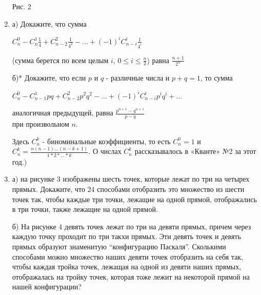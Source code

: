 \begin{enumerate}[font=\bfseries, wide,  labelindent=0pt, noitemsep]
Рис. 2
\newline
    \item а) Докажите, что сумма
    \begin{center}
    $C_{n}^{0} - C_{n}^{1} \frac{1}{4} + C_{n-2}^{2} \frac{1}{4^2} - ... + (-1)^i C_{n-i}^{i} \frac{1}{4^i}$
    \end{center}
    (сумма берется по всем целым $i$, $0 \leq i \leq \frac{n}{2}$) равна $\frac{n+1}{2^n}$ 
    \par
    б)* Докажите, что если $p$ и $q$ - различные числа и $p + q = 1$, то сумма 
    \begin{center}
    $C_{n}^{0}-C_{n-1}^{1}pq+C_{n-2}^{2}p^2q^2 - ... + (-1)^iC_{n-i}^{i}p^iq^i+...$
    \end{center}
    аналогичная предыдущей, равна $\frac{p^{n+1}-q^{n+1}}{p-q}$ \\
    при произвольном $n$. \par
    Здесь $C_{n}^{k}$ - биноминальные коэффициенты, то есть $C_{n}^{0} = 1$ и $C_{n}^{k} = \frac{n(n-1)...(n-k+1)}{1*2*...*k}$. О числах $C_{n}^{k}$ рассказывалось в «Кванте» №2 за этот год.) 
    \par
{}
\item
    а) на рисунке 3 изображены шесть точек, которые лежат по три на четырех прямых. Докажите, что $24$ способами отобразить это множество из шести точек так, чтобы каждые три точки, лежащие на одной прямой, отображались в три точки, также лежащие на одной прямой. \par
    б) На рисунке 4 девять точек лежат по три на девяти прямых, причем через каждую точку проходит по три такхи прямых. Эти девять точек  и девять прямых образуют знаменитую “конфигурацию Паскаля”. Сколькими способами можно множество наших девяти точек отобразить на себя так, чтобы каждая тройка точек, лежащая на одной из девяти наших прямых, отображалась на тройку точек, которая тоже лежит на некоторой прямой на нашей конфигурации? 
 \end{enumerate}
 





